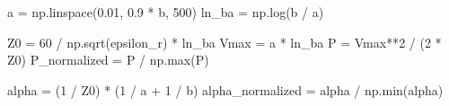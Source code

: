 \documentclass[
  letterpaper,
  DIV=11,
  numbers=noendperiod]{scrartcl}
\newenvironment{Shaded}{\begin{snugshade}}{\end{snugshade}}
\newcommand{\BuiltInTok}[1]{\textcolor[rgb]{0.00,0.23,0.31}{#1}}
\newcommand{\DecValTok}[1]{\textcolor[rgb]{0.68,0.00,0.00}{#1}}
\newcommand{\FloatTok}[1]{\textcolor[rgb]{0.68,0.00,0.00}{#1}}
\newcommand{\NormalTok}[1]{\textcolor[rgb]{0.00,0.23,0.31}{#1}}
\newcommand{\OperatorTok}[1]{\textcolor[rgb]{0.37,0.37,0.37}{#1}}
\begin{document}
\begin{Shaded}
\begin{Highlighting}[]
\NormalTok{a }\OperatorTok{=}\NormalTok{ np.linspace(}\FloatTok{0.01}\NormalTok{, }\FloatTok{0.9} \OperatorTok{*}\NormalTok{ b, }\DecValTok{500}\NormalTok{)}
\NormalTok{ln\_ba }\OperatorTok{=}\NormalTok{ np.log(b }\OperatorTok{/}\NormalTok{ a)}

\NormalTok{Z0 }\OperatorTok{=} \DecValTok{60} \OperatorTok{/}\NormalTok{ np.sqrt(epsilon\_r) }\OperatorTok{*}\NormalTok{ ln\_ba}
\NormalTok{Vmax }\OperatorTok{=}\NormalTok{ a }\OperatorTok{*}\NormalTok{ ln\_ba}
\NormalTok{P }\OperatorTok{=}\NormalTok{ Vmax}\OperatorTok{**}\DecValTok{2} \OperatorTok{/}\NormalTok{ (}\DecValTok{2} \OperatorTok{*}\NormalTok{ Z0)}
\NormalTok{P\_normalized }\OperatorTok{=}\NormalTok{ P }\OperatorTok{/}\NormalTok{ np.}\BuiltInTok{max}\NormalTok{(P)}

\NormalTok{alpha }\OperatorTok{=}\NormalTok{ (}\DecValTok{1} \OperatorTok{/}\NormalTok{ Z0) }\OperatorTok{*}\NormalTok{ (}\DecValTok{1} \OperatorTok{/}\NormalTok{ a }\OperatorTok{+} \DecValTok{1} \OperatorTok{/}\NormalTok{ b)}
\NormalTok{alpha\_normalized }\OperatorTok{=}\NormalTok{ alpha }\OperatorTok{/}\NormalTok{ np.}\BuiltInTok{min}\NormalTok{(alpha)}
\end{Highlighting}
\end{Shaded}
\end{document}
